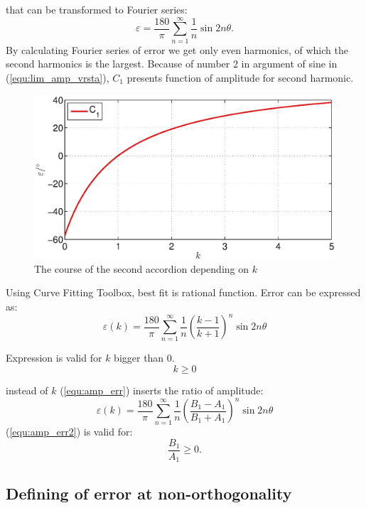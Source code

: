 \documentclass[a4paper]{article}
\begin{document}
that can be transformed to Fourier series:
\begin{equation}
\label{equ:lim_amp_vrsta}
\varepsilon = \frac{180}{\pi}\sum_{n=1}^{\infty}\frac{1}{n} \sin 2 n \theta.
\end{equation}
By calculating Fourier series of error we get only even harmonics, of which the second harmonics is the largest.
Because of number 2 in argument of sine in (\ref{equ:lim_amp_vrsta}), $C_1$ presents function of amplitude for second harmonic. 
\begin{figure}[!htb]
	\begin{center}
		\includegraphics[width=\linewidth]{./Slike/amp.eps}
		\caption{The course of the second accordion depending on $k$} \label{fig:amp}
	\end{center}
\end{figure}

Using Curve Fitting Toolbox, best fit is rational function. Error can be expressed as:
\begin{equation}
\label{equ:amp_err}
\varepsilon(k) =\frac{180}{\pi}\sum_{n=1}^{\infty}\frac{1}{n}(\frac{k-1}{k+1})^n \sin 2 n \theta
\end{equation}

Expression is valid for  $k$ bigger than 0.$$k \geq 0$$

instead of  $k$  (\ref{equ:amp_err})  inserts the ratio of amplitude:
\begin{equation}
\label{equ:amp_err2}
\varepsilon(k) =\frac{180}{\pi}\sum_{n=1}^{\infty}\frac{1}{n}(\frac{B_1-A_1}{B_1+A_1})^n \sin 2 n \theta
\end{equation}
(\ref{equ:amp_err2}) is valid for: $$\frac{B_1}{A_1} \geq 0.$$

\subsection{Defining of error at non-orthogonality}
\end{document}
